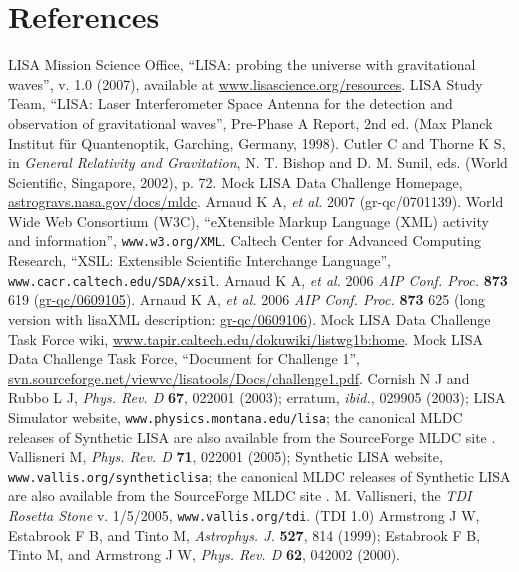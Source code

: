 \documentclass[12pt]{iopart}
\begin{document}
\section*{References}
\begin{thebibliography}{10}
 LISA Mission Science Office, ``LISA: probing the universe with gravitational waves'', v. 1.0 (2007), available at \url{www.lisascience.org/resources}.
 LISA Study Team, ``LISA: Laser Interferometer Space Antenna for the detection and observation of gravitational waves'', Pre-Phase A Report, 2nd ed. (Max Planck Institut f\"ur Quantenoptik, Garching, Germany, 1998).
%
 Cutler C and Thorne K S, in \emph{General Relativity and Gravitation}, N. T. Bishop and D. M. Sunil, eds. (World Scientific, Singapore, 2002), p. 72.
 Mock LISA Data Challenge Homepage, \url{astrogravs.nasa.gov/docs/mldc}.
 Arnaud K A, {\it et al.} 2007 (gr-qc/0701139).
 World Wide Web Consortium (W3C), ``eXtensible Markup Language (XML) activity and information'', \texttt{www.w3.org/XML}.
 Caltech Center for Advanced Computing Research, ``XSIL: Extensible Scientific Interchange Language'', \texttt{www.cacr.caltech.edu/SDA/xsil}.
 Arnaud K A, {\it et al.} 2006 {\it AIP Conf. Proc.} {\bf 873} 619 (\url{gr-qc/0609105}).
 Arnaud K A, {\it et al.} 2006 {\it AIP Conf. Proc.} {\bf 873} 625 (long version with lisaXML description: \url{gr-qc/0609106}).
 Mock LISA Data Challenge Task Force wiki, \url{www.tapir.caltech.edu/dokuwiki/listwg1b:home}.
 Mock LISA Data Challenge Task Force, ``Document for Challenge 1'', \url{svn.sourceforge.net/viewvc/lisatools/Docs/challenge1.pdf}.
 Cornish N J and Rubbo L J, \emph{Phys. Rev. D} \textbf{67}, 022001 (2003); erratum, \emph{ibid.}, 029905 (2003); LISA Simulator website, \texttt{www.physics.montana.edu/lisa}; the canonical MLDC releases of Synthetic LISA are also available from the SourceForge MLDC site \cite{lisatools}.
 Vallisneri M, \emph{Phys. Rev. D} \textbf{71}, 022001 (2005); Synthetic LISA website, \texttt{www.vallis.org/syntheticlisa}; the canonical MLDC releases of Synthetic LISA are also available from the SourceForge MLDC site \cite{lisatools}.
 M. Vallisneri, the \emph{TDI Rosetta Stone} v. 1/5/2005, \texttt{www.vallis.org/tdi}.
 (TDI 1.0) Armstrong J W, Estabrook F B, and Tinto M,
\emph{Astrophys. J.} \textbf{527}, 814 (1999); Estabrook F B, Tinto M, and Armstrong J W, \emph{Phys. Rev. D} \textbf{62}, 042002 (2000).

\end{thebibliography}
\end{document}
